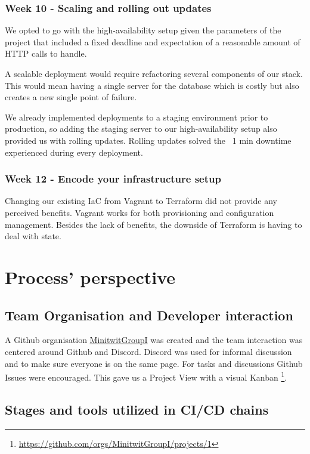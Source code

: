 \documentclass{article}
\begin{document}
\subsubsection{Week 10 - Scaling and rolling out updates }

We opted to go with the high-availability setup given the parameters of the project that included a fixed deadline and expectation of a reasonable amount of HTTP calls to handle. 

A scalable deployment would require refactoring several components of our stack. This would mean having a single server for the database which is costly but also creates a new single point of failure. 

We already implemented deployments to a staging environment prior to production, so adding the staging server to our high-availability setup also provided us with rolling updates. Rolling updates solved the ~1 min downtime experienced during every deployment.  

\subsubsection{Week 12 - Encode your infrastructure setup }

Changing our existing IaC from Vagrant to Terraform did not provide any perceived benefits. Vagrant works for both provisioning and configuration management. Besides the lack of benefits, the downside of Terraform is having to deal with state. 

\section{Process' perspective} \label{cicd}

\subsection{Team Organisation and Developer interaction} 

A Github organisation \href{https://github.com/MinitwitGroupI/}{MinitwitGroupI} was created and the team interaction was centered around Github and Discord. Discord was used for informal discussion and to make sure everyone is on the same page. For tasks and discussions Github Issues were encouraged. This gave us a Project View with a visual Kanban \footnote{\url{https://github.com/orgs/MinitwitGroupI/projects/1}}. 

\subsection{Stages and tools utilized in CI/CD chains}
\end{document}
